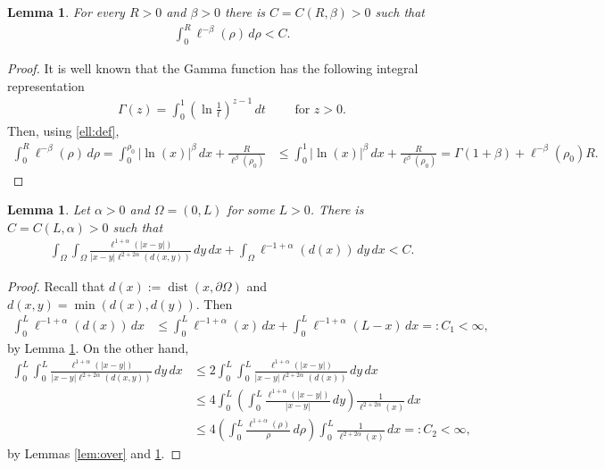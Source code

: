 \documentclass[10 pt]{article}
\newtheorem{lemma}[theorem]{Lemma}
\numberwithin{equation}{section}
\def\dist{\operatorname{dist}}
\begin{document}
\begin{lemma}\label{lem:ellbeta}
For every $R>0$ and $\beta>0$ there is $C=C(R,\beta)>0$ such that
\begin{align*}
\int_0^R \ell^{-\beta}(\rho)\, d\rho<C.
\end{align*}
\end{lemma}
\begin{proof}
 It is well known that the Gamma function has the following integral representation
 \begin{align*}
     \Gamma(z)=\int_0^1\left(\ln \frac{1}{t}\right)^{z-1}\, dt\qquad \text{ for }z>0.
 \end{align*}
Then, using \eqref{ell:def},
\begin{align*}
\int_0^R \ell^{-\beta}(\rho)\,d\rho
=
\int_0^{\rho_0} |\ln(x)|^{\beta}\,dx
+
\frac{R}{\ell^{\beta}(\rho_0)}
&\leq 
\int_0^{1} |\ln(x)|^{\beta}\,dx
+
\frac{R}{\ell^{\beta}(\rho_0)}=\Gamma(1+\beta)+\ell^{-\beta}(\rho_0)R.
\end{align*}
\end{proof}


\begin{lemma}\label{lem:int:bds}
Let $\alpha>0$ and $\Omega=(0,L)$ for some $L>0$. There is $C=C(L,\alpha)>0$ such that 
\begin{align*}
\int_{\Omega}\int_{\Omega}\frac{\ell^{1+\alpha}(|x-y|)}{|x-y|\ell^{2+2\alpha}(d(x,y))}\,dy\, dx+ \int_{\Omega}\ell^{-1+\alpha}(d(x))\, dy\,dx<C.
\end{align*}
\end{lemma}
\begin{proof}
Recall that $d(x):=\dist(x,\partial \Omega)$ and $d(x,y)=\min(d(x),d(y)).$ Then
\begin{align*}
\int_0^L \ell^{-1+\alpha}(d(x))\,dx&\leq \int_0^L \ell^{-1+\alpha}(x)\,dx+\int_0^L \ell^{-1+\alpha}(L-x)\,dx=:C_1<\infty,
\end{align*}
by Lemma \ref{lem:ellbeta}. On the other hand,
\begin{align*}
\int_0^L\int_0^L\frac{\ell^{1+\alpha}(|x-y|)}{|x-y|\ell^{2+2\alpha}(d(x,y))}\,dy\, dx
&\leq 2\int_0^L\int_0^L\frac{\ell^{1+\alpha}(|x-y|)}{|x-y|\ell^{2+2\alpha}(d(x))}\,dy\, dx\\
&\leq 4\int_0^L\left(\int_0^L\frac{\ell^{1+\alpha}(|x-y|)}{|x-y|}\,dy\right)\frac{1}{\ell^{2+2\alpha}(x)}\, dx\\
&\leq 4\left(\int_0^L\frac{\ell^{1+\alpha}(\rho)}{\rho}\,d\rho\right)\int_0^L\frac{1}{\ell^{2+2\alpha}(x)}\, dx=:C_2<\infty,
\end{align*}
by Lemmas \ref{lem:over} and \ref{lem:ellbeta}.
\end{proof}
\end{document}
